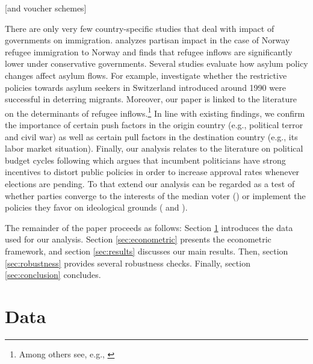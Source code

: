 \documentclass[a4paper,12pt]{article}
\begin{document}
 [and voucher schemes]

There are only very few country-specific studies that deal with impact of governments on immigration. \citet{gudbrandsen2010} analyzes partisan impact in the case of Norway refugee immigration to Norway and finds that refugee inflows are significantly lower under conservative governments. Several studies evaluate how asylum policy changes affect asylum flows. For example, \citet{holzer2000} investigate whether the restrictive policies towards asylum seekers in Switzerland introduced around 1990 were successful in deterring migrants. Moreover, our paper is linked to the literature on the determinants of refugee inflows.\footnote{Among others see, e.g., \citep{neumayer2005, moore2007, hatton2009, hatton2016}} In line with existing findings, we confirm the importance of certain push factors in the origin country (e.g., political terror and civil war) as well as certain pull factors in the destination country (e.g., its labor market situation). Finally, our analysis relates to the literature on political budget cycles following \citet{nor75} which argues that incumbent politicians have strong incentives to distort public policies in order to increase approval rates whenever elections are pending. To that extend our analysis can be regarded as a test of whether parties converge to the interests of the median voter (\citet{downs1957}) or implement the policies they favor on ideological grounds (\citet{hibbs1977} and \citet{alesina1987}).


The remainder of the paper proceeds as follows: Section \ref{sec:data} introduces the data used for our analysis. Section \ref{sec:econometric} presents the econometric framework, and section \ref{sec:results} discusses our main results. Then, section \ref{sec:robustness} provides several robustness checks. Finally, section \ref{sec:conclusion} concludes.

\section{Data} \label{sec:data}
\end{document}
